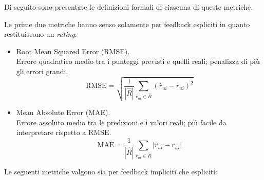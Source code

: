 Di seguito sono presentate le definizioni formali di ciascuna di queste metriche.

Le prime due metriche hanno senso solamente per feedback espliciti in quanto restituiscono un \textit{rating}:

\begin{itemize}
    \item Root Mean Squared Error (RMSE).\\
    Errore quadratico medio tra i punteggi previsti e quelli reali; penalizza di più gli errori grandi.
    \[
    \text{RMSE} = \sqrt{ \frac{1}{|\hat{R}|} \sum_{\hat{r}_{ui} \in \hat{R}} (\hat{r}_{ui} - r_{ui})^2 }
    \]
    
    \item Mean Absolute Error (MAE).\\
    Errore assoluto medio tra le predizioni e i valori reali; più facile da interpretare rispetto a RMSE.
    \[
    \text{MAE} = \frac{1}{|\hat{R}|} \sum_{\hat{r}_{ui} \in \hat{R}} |\hat{r}_{ui} - r_{ui}|
    \]
\end{itemize}   

Le seguenti metriche valgono sia per feedback impliciti che espliciti:

